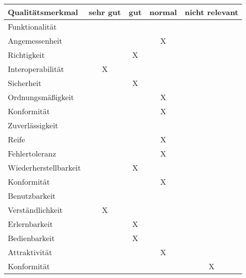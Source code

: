 \label{app:qualitaetsanforderungen}

\begin{table}[H]
	\centering
	\begin{tabular}{lcccc}
		\rowcolor{white!15}
		\textbf{Qualitätsmerkmal}			& \textbf{sehr gut}	& \textbf{gut}	& \textbf{normal}	& \textbf{nicht relevant}	\\\hline
		
		\rowcolor{MidnightBlue!15}
		Funktionalität 						&					&				&					&							\\
		\hspace{1.5em} Angemessenheit		&					&				& X					&							\\
		\hspace{1.5em} Richtigkeit			&					&	X			& 					&							\\
		\hspace{1.5em} Interoperabilität	&	X				&				& 					&							\\
		\hspace{1.5em} Sicherheit			&					&	X			& 					&							\\
		\hspace{1.5em} Ordnungsmäßigkeit	&					&				& X					&							\\
		\hspace{1.5em} Konformität			&					&				& X					&							\\
		
		\rowcolor{MidnightBlue!15}
		Zuverlässigkeit 					&					&				&					&							\\
		\hspace{1.5em} Reife				&					&				& X					&							\\
		\hspace{1.5em} Fehlertoleranz		&					&				& X					&							\\
		\hspace{1.5em} Wiederherstellbarkeit&					&	X			& 					&							\\
		\hspace{1.5em} Konformität			&					&				& X					&							\\
		
		\rowcolor{MidnightBlue!15}
		Benutzbarkeit 						&					&				&					&							\\
		\hspace{1.5em} Verständlichkeit		&	X				&				& 					&							\\
		\hspace{1.5em} Erlernbarkeit		&					&	X			& 					&							\\
		\hspace{1.5em} Bedienbarkeit		&					&	X			& 					&							\\
		\hspace{1.5em} Attraktivität		&					&				& X					&							\\
		\hspace{1.5em} Konformität			&					&				& 					&	X						\\
		

\end{tabular}
\end{table}
